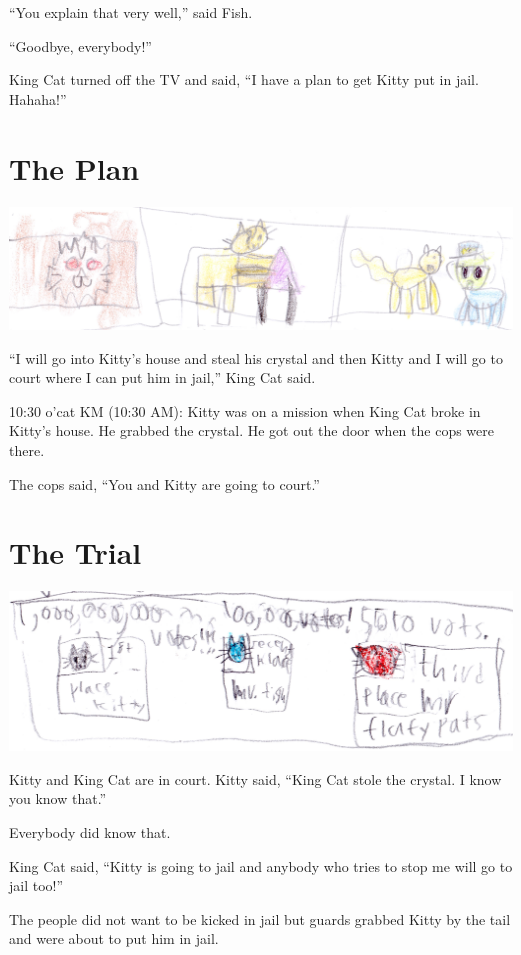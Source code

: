 \documentclass[]{krantz}
\begin{document}
``You explain that very well,'' said Fish.

``Goodbye, everybody!''

King Cat turned off the TV and said, ``I have a plan to get Kitty put in
jail. Hahaha!''

\hypertarget{the-plan}{%
\chapter{The Plan}\label{the-plan}}

\includegraphics{img/cattriangle.jpg}

``I will go into Kitty's house and steal his crystal and then Kitty and
I will go to court where I can put him in jail,'' King Cat said.

10:30 o'cat KM (10:30 AM): Kitty was on a mission when King Cat broke in
Kitty's house. He grabbed the crystal. He got out the door when the cops
were there.

The cops said, ``You and Kitty are going to court.''

\hypertarget{the-trial}{%
\chapter{The Trial}\label{the-trial}}

\includegraphics{img/thirdplace.jpg}

Kitty and King Cat are in court. Kitty said, ``King Cat stole the
crystal. I know you know that.''

Everybody did know that.

King Cat said, ``Kitty is going to jail and anybody who tries to stop me
will go to jail too!''

The people did not want to be kicked in jail but guards grabbed Kitty by
the tail and were about to put him in jail.
\end{document}

